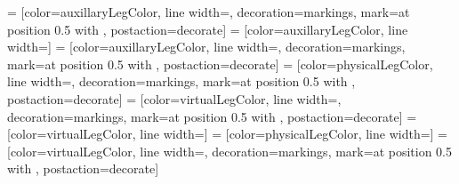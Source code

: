  = [color=auxillaryLegColor, line width=\lineWidthThin, decoration={markings, mark=at position 0.5 with {\pgftransformscale{\arrowScaleSmall}}}, postaction={decorate}]
 = [color=auxillaryLegColor, line width=\lineWidthThin]
 = [color=auxillaryLegColor, line width=\lineWidthThin, decoration={markings, mark=at position 0.5 with {\pgftransformscale{\arrowScaleSmall}}}, postaction={decorate}]
 = [color=physicalLegColor, line width=\lineWidthThin, decoration={markings, mark=at position 0.5 with {\pgftransformscale{\arrowScaleSmall}}}, postaction={decorate}]
 = [color=virtualLegColor, line width=\lineWidthThin, decoration={markings, mark=at position 0.5 with {\pgftransformscale{\arrowScaleSmall}}}, postaction={decorate}]
 = [color=virtualLegColor, line width=\lineWidthThin]
 = [color=physicalLegColor, line width=\lineWidthThin]
 = [color=virtualLegColor, line width=\lineWidthThin, decoration={markings, mark=at position 0.5 with {\pgftransformscale{\arrowScaleSmall}}}, postaction={decorate}]

\usepackage{amssymb}
\newcommand{\id}{\mathbbb{1}}
\newcommand{\iu}{\mathrm{i}}%
\newcommand{\Stiefel}{\text{St}(n,p)}



\newcommand{\convexhull}[2]{
	[   
	create hullnodes/.code={
		\global\edef\namelist{#1}
		\foreach [count=\counter] \nodename in \namelist {
			\global\edef\numberofnodes{\counter}
			\node at (\nodename) [draw=none,name=hullnode\counter] {};
		}
		\node at (hullnode\numberofnodes) [name=hullnode0,draw=none] {};
		\pgfmathtruncatemacro\lastnumber{\numberofnodes+1}
		\node at (hullnode1) [name=hullnode\lastnumber,draw=none] {};
	},
	create hullnodes
	]
	($(hullnode1)!#2!-90:(hullnode0)$)
	\foreach [
	evaluate=\currentnode as \previousnode using \currentnode-1,
	evaluate=\currentnode as \nextnode using \currentnode+1
	] \currentnode in {1,...,\numberofnodes} {
		-- ($(hullnode\currentnode)!#2!-90:(hullnode\previousnode)$)
		let \p1 = ($(hullnode\currentnode)!#2!-90:(hullnode\previousnode) - (hullnode\currentnode)$),
		\n1 = {atan2(\y1,\x1)},
		\p2 = ($(hullnode\currentnode)!#2!90:(hullnode\nextnode) - (hullnode\currentnode)$),
		\n2 = {atan2(\y2,\x2)},
		\n{delta} = {-Mod(\n1-\n2,360)}
		in 
		{arc [start angle=\n1, delta angle=\n{delta}, radius=#2]}
	}
	-- cycle
}


